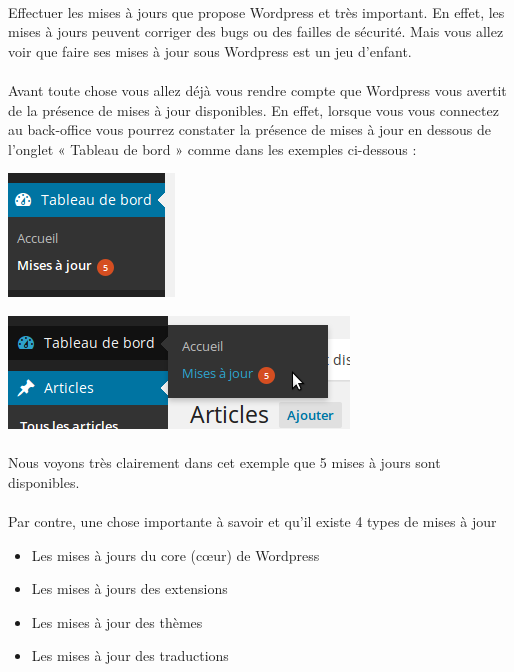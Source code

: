 \documentclass[10pt,a4paper]{article}
\begin{document}
\paragraph{}Effectuer les mises à jours que propose Wordpress et très important. En effet, les mises à jours peuvent corriger des bugs ou des failles de sécurité. Mais vous allez voir que faire ses mises à jour sous Wordpress est un jeu d'enfant.
\paragraph{}Avant toute chose vous allez déjà vous rendre compte que Wordpress vous avertit de la présence de mises à jour disponibles. En effet, lorsque vous vous connectez au back-office vous pourrez constater la présence de mises à jour en dessous de l'onglet « Tableau de bord » comme dans les exemples ci-dessous :
\begin{center}
\includegraphics[scale=0.5]{img/0050.png}
\end{center}
\begin{center}
\includegraphics[scale=0.5]{img/0051.png}
\end{center}
\paragraph{}Nous voyons très clairement dans cet exemple que 5 mises à jours sont disponibles.
\paragraph{}Par contre, une chose importante à savoir et qu'il existe 4 types de mises à jour
\begin{itemize}
\item Les mises à jours du core (cœur) de Wordpress
\item Les mises à jours des extensions
\item Les mises à jour des thèmes
\item Les mises à jour des traductions
\end{itemize}
\end{document}

